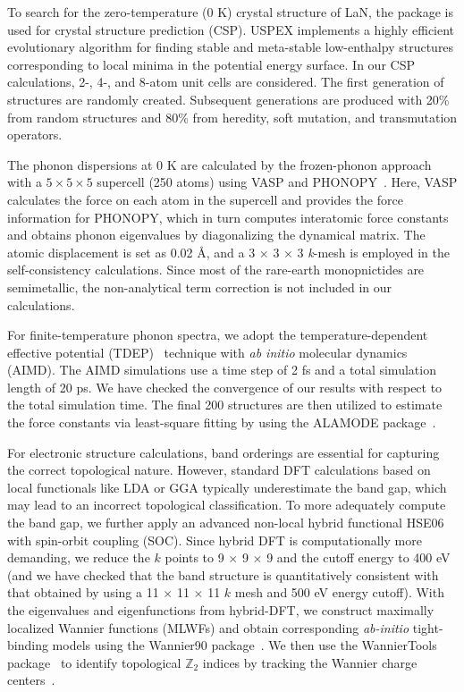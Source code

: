 	To search for the zero-temperature (0 K) crystal structure of LaN, the  package \cite{oganov2006crystal, glass2006uspex, lyakhov2013new} is used for crystal structure prediction (CSP). USPEX implements a highly efficient evolutionary algorithm for finding stable and meta-stable low-enthalpy structures corresponding to local minima in the potential energy surface. In our CSP calculations, 2-, 4-, and 8-atom unit cells are considered. The first generation of structures are randomly created. Subsequent generations are produced with 20\% from random structures and 80\% from heredity, soft mutation, and transmutation operators.
	
	The phonon dispersions at 0 K are calculated by the frozen-phonon approach with a $5\times 5 \times 5$ supercell (250 atoms) using VASP and PHONOPY~\cite{phonopy}. Here, VASP calculates the force on each atom in the supercell and provides the force information for PHONOPY, which in turn computes interatomic force constants and obtains phonon eigenvalues by diagonalizing the dynamical matrix. The atomic displacement is set as 0.02 \r{A}, and a 3 $\times$ 3 $\times$ 3 \textit{k}-mesh is employed in the self-consistency calculations. Since most of the rare-earth monopnictides are semimetallic, the non-analytical term correction is not included in our calculations.

	For finite-temperature phonon spectra, we adopt the temperature-dependent effective potential (TDEP)~\cite{TDEP} technique with \textit{ab initio} molecular dynamics (AIMD). The AIMD simulations use a time step of 2 fs and a total simulation length of 20 ps. We have checked the convergence of our results with respect to the total simulation time. The final 200 structures are then utilized to estimate the force constants via least-square fitting by using the ALAMODE package~\cite{Tadano_2014}.
	
	For electronic structure calculations, band orderings are essential for capturing the correct topological nature. However, standard DFT calculations based on local functionals like LDA or GGA typically underestimate the band gap, which may lead to an incorrect topological classification. To more adequately compute the band gap, we further apply an advanced non-local hybrid functional HSE06~\cite{HSE06} with spin-orbit coupling (SOC). Since hybrid DFT is computationally more demanding, we reduce the $k$ points to 9 $\times$ 9 $\times$ 9 and the cutoff energy to 400 eV (and we have checked that the band structure is quantitatively consistent with that obtained by using a 11 $\times$ 11 $\times$ 11 $k$ mesh and 500 eV energy cutoff). With the eigenvalues and eigenfunctions from hybrid-DFT, we construct maximally localized Wannier functions (MLWFs) and obtain corresponding \textit{ab-initio} tight-binding models using the Wannier90 package~\cite{wannier90}. We then use the WannierTools package~\cite{wanniertools} to identify topological $\mathbb{Z}_2$ indices by tracking the Wannier charge centers~\cite{z2pack}.
	
